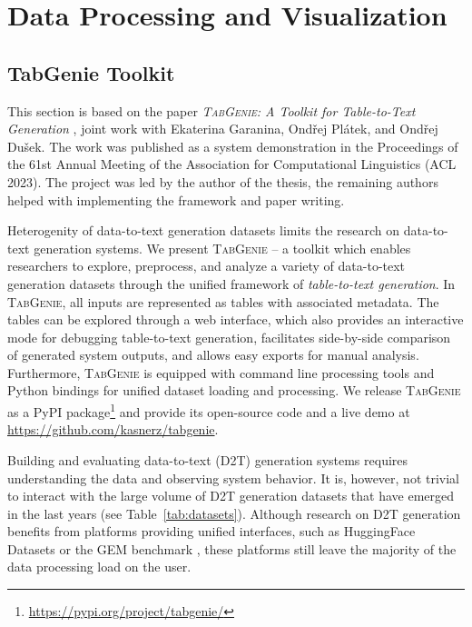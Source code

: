 
\chapter{Data Processing and Visualization}
\label{chap:tabgenie}
\section{TabGenie Toolkit}
\label{sec:tabgenie}

\begin{refbox}
    This section is based on the paper \emph{\textsc{TabGenie}: A Toolkit for Table-to-Text Generation} \cite{kasnerTabGenieToolkitTabletoText2023}, joint work with Ekaterina Garanina, Ondřej Plátek, and Ondřej Dušek. The work was published as a system demonstration in the Proceedings of the 61st Annual Meeting of the Association for Computational Linguistics (ACL 2023). The project was led by the author of the thesis, the remaining authors helped with implementing the framework and paper writing.
\end{refbox}

Heterogenity of data-to-text generation datasets limits the research on data-to-text generation systems. We present \textsc{TabGenie} -- a toolkit which enables researchers to explore, preprocess, and analyze a variety of data-to-text generation datasets through the unified framework of \textit{table-to-text generation}. In \textsc{TabGenie}, all inputs are represented as tables with associated metadata. The tables can be explored through a web interface, which also provides an interactive mode for debugging table-to-text generation, facilitates side-by-side comparison of generated system outputs, and allows easy exports for manual analysis. Furthermore, \textsc{TabGenie} is equipped with command line processing tools and Python bindings for unified dataset loading and processing. We release \textsc{TabGenie} as a PyPI package\footnote{\url{https://pypi.org/project/tabgenie/}} and provide its open-source code and a live demo at \url{https://github.com/kasnerz/tabgenie}.

Building and evaluating data-to-text (D2T) generation systems \cite{gatt2018survey,sharma2022innovations} requires understanding the data and observing system behavior. It is, however, not trivial to interact with the large volume of D2T generation datasets that have emerged in the last years (see Table~\ref{tab:datasets}).
Although research on D2T generation benefits from platforms providing unified interfaces, such as HuggingFace Datasets \cite{lhoest2021datasets} or the GEM benchmark \cite{gehrmann2021gem}, these platforms still leave the majority of the data processing load on the user.

